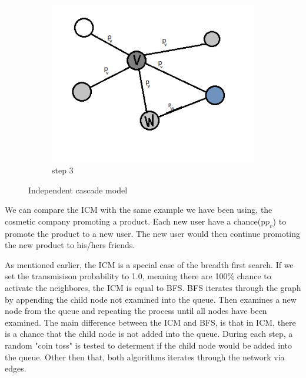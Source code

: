 \begin{figure}[!ht]
\begin{subfigure}{0.3\textwidth}
		\includegraphics[width=\textwidth]{Figures/ICM3}
		\caption{step 3} 
		\label{fig:ICM3}
	\end{subfigure}
	\caption{Independent cascade model}
	\label{fig:ICM_step}
\end{figure}

We can compare the ICM with the same example we have been using, the cosmetic company promoting a product. Each new user have a chance(p$p_v$) to promote the product to a new user. The new user would then continue promoting the new product to his/hers friends. 

As mentioned earlier, the ICM is a special case of the breadth first search. If we set the transmisison probability to 1.0, meaning there are 100\% chance to activate the neighbores, the ICM is equal to BFS. BFS iterates through the graph by appending the child node not examined into the queue. Then examines a new node from the queue and repeating the process until all nodes have been examined. The main difference between the ICM and BFS, is that in ICM, there is a chance that the child node is not added into the queue. During each step, a random "coin toss" is tested to determent if the child node would be added into the queue. Other then that, both algorithms iterates through the network via edges.

